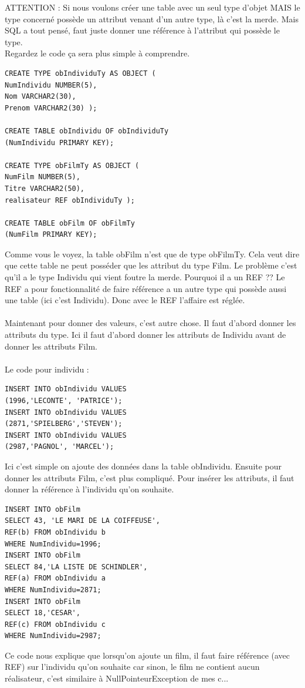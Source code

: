 \documentclass{report}
\begin{document}
ATTENTION : Si nous voulons créer une table avec un seul type d'objet MAIS le type concerné possède un attribut venant d'un autre type, là c'est la merde. Mais SQL a tout pensé, faut juste donner une référence à l'attribut qui possède le type. \\
Regardez le code ça sera plus simple à comprendre.
\begin{lstlisting}[style=MySQLStyle]
CREATE TYPE obIndividuTy AS OBJECT (
NumIndividu NUMBER(5),
Nom VARCHAR2(30),
Prenom VARCHAR2(30) );

CREATE TABLE obIndividu OF obIndividuTy
(NumIndividu PRIMARY KEY);

CREATE TYPE obFilmTy AS OBJECT (
NumFilm NUMBER(5),
Titre VARCHAR2(50),
realisateur REF obIndividuTy );

CREATE TABLE obFilm OF obFilmTy
(NumFilm PRIMARY KEY);
\end{lstlisting}
Comme vous le voyez, la table obFilm n'est que de type obFilmTy. Cela veut dire que cette table ne peut posséder que les attribut du type Film. Le problème c'est qu'il a le type Individu qui vient foutre la merde. Pourquoi il a un REF ?? Le REF a pour fonctionnalité de faire référence a un autre type qui possède aussi une table (ici c'est Individu). Donc avec le REF l'affaire est réglée.\\ \\

Maintenant pour donner des valeurs, c'est autre chose. Il faut d'abord donner les attributs du type. Ici il faut d'abord donner les attributs de Individu avant de donner les attributs Film.\\ \\
Le code pour individu :
\begin{lstlisting}[style=MySQLStyle]
INSERT INTO obIndividu VALUES
(1996,'LECONTE', 'PATRICE');
INSERT INTO obIndividu VALUES
(2871,'SPIELBERG','STEVEN');
INSERT INTO obIndividu VALUES
(2987,'PAGNOL', 'MARCEL');
\end{lstlisting}
Ici c'est simple on ajoute des données dans la table obIndividu.
Ensuite pour donner les attributs Film, c'est plus compliqué. Pour insérer les attributs, il faut donner la référence à l'individu qu'on souhaite. 
\begin{lstlisting}[style=MySQLStyle]
INSERT INTO obFilm
SELECT 43, 'LE MARI DE LA COIFFEUSE',
REF(b) FROM obIndividu b
WHERE NumIndividu=1996;
INSERT INTO obFilm
SELECT 84,'LA LISTE DE SCHINDLER',
REF(a) FROM obIndividu a
WHERE NumIndividu=2871;
INSERT INTO obFilm
SELECT 18,'CESAR',
REF(c) FROM obIndividu c
WHERE NumIndividu=2987;
\end{lstlisting}
Ce code nous explique que lorsqu'on ajoute un film, il faut faire référence (avec REF) sur l'individu qu'on souhaite car sinon, le film ne contient aucun réalisateur, c'est similaire à NullPointeurException de mes c...
\end{document}
